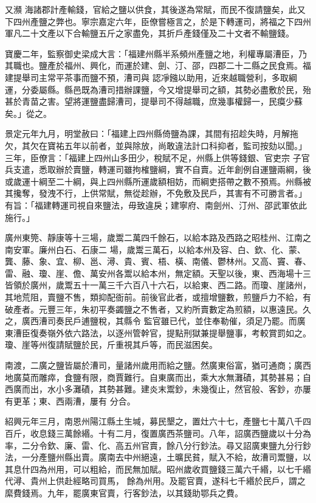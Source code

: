 \begin{pinyinscope}
 又瀕
 海諸郡計產輸錢，官給之鹽以供食，其後遂為常賦，而民不復請鹽矣，此又下四州產鹽之弊也。寧宗嘉定六年，臣僚嘗極言之，於是下轉運司，將福之下四州軍凡二十文產以下合輸鹽五斤之家盡免，其折戶產錢僅及二十文者不輸鹽錢。



 寶慶二年，監察御史梁成大言：「福建州縣半系頻州產鹽之地，利權專屬漕臣，乃其職也。鹽產於福州、興化，而運於建、劍、汀、邵，四郡二十二縣之民食焉。福建提舉司主常平茶事而鹽不預，漕司與
 認凈鏹以助用，近來越職營利，多取綱運，分委屬縣。縣邑既為漕司措辦課鹽，今又增提舉司之額，其勢必盡敷於民，殆甚於青苗之害。望將運鹽盡歸漕司，提舉司不得越職，庶幾事權歸一，民瘼少蘇矣。」從之。



 景定元年九月，明堂赦曰：「福建上四州縣倚鹽為課，其間有招趁失時，月解拖欠，其欠在寶祐五年以前者，並與除放，尚敢違法計口科抑者，監司按劾以聞。」三年，臣僚言：「福建上四州山多田少，稅賦不足，州縣上供等錢銀、官吏宗
 子官兵支遣，悉取辦於賣鹽，轉運司雖拘榷鹽綱，實不自賣。近年創例自運鹽兩綱，後或歲運十綱至二十綱，與上四州縣所運歲額相妨，而綱吏搭帶之數不預焉。州縣被其攙奪，發洩不行，上供常賦，無從趁辦，不免敷及民戶，其害有不可勝言者。」有旨：「福建轉運司視自來鹽法，毋致違戾；建寧府、南劍州、汀州、邵武軍依此施行。」



 廣州東筦、靜康等十三場，歲鬻二萬四千餘石，以給本路及西路之昭桂州、江南之南安軍。廉州白石、石康二
 場，歲鬻三萬石，以給本州及容、白、欽、化、蒙、龔、藤、象、宜、柳、邕、潯、貴、賓、梧、橫、南儀、鬱林州。又高、竇、春、雷、融、瓊、崖、儋、萬安州各鬻以給本州，無定額。天聖以後，東、西海場十三皆領於廣州，歲鬻五十一萬三千六百八十六石，以給東、西二路。而瓊、崖諸州，其地荒阻，賣鹽不售，類抑配衙前。前後官此者，或擅增鹽數，煎鹽戶力不給，有破產者。元豐三年，朱初平奏蠲鹽之不售者，又約所賣數定為煎額，以惠遠民。久之，廣西漕司奏民戶逋鹽稅，其縣令
 監官雖已代，並住奉勒催，須足乃罷。而廣東漕臣復奏嶺外依六路法，以逐州管幹官，提點刑獄兼提舉鹽事，考較賞罰如之。瓊、崖等州復請賦鹽於民，斤重視其戶等，而民滋困矣。



 南渡，二廣之鹽皆屬於漕司，量諸州歲用而給之鹽。然廣東俗富，猶可通商；廣西地廣莫而雕瘁，食鹽有限，商賈難行。自東廣而出，乘大水無灘磧，其勢甚易；自西廣而出，水小多灘磧，其勢甚難。建炎末鬻鈔，未幾復止，然官般、客鈔，亦屢有更革；東、西兩漕，屢有
 分合。



 紹興元年三月，南恩州陽江縣土生堿，募民墾之，置灶六十七，產鹽七十萬八千四百斤，收息錢三萬餘緡。十有二月，復置廣西茶鹽司。八年，詔廣西鹽歲以十分為率，二分令欽、廉、雷、化、高五州官賣，餘八分行鈔法。尋又詔廣東鹽九分行鈔法，一分產鹽州縣出賣。廣南去中州絕遠，土曠民貧，賦入不給，故漕司鬻鹽，以其息什四為州用，可以粗給，而民無加賦。昭州歲收買鹽錢三萬六千緡，以七千緡代潯、貴州上供赴經略司買馬，
 餘為州用。及罷官賣，遂科七千緡於民戶，謂之縻費錢焉。九年，罷廣東官賣，行客鈔法，以其錢助鄂兵之費。




\end{pinyinscope}

